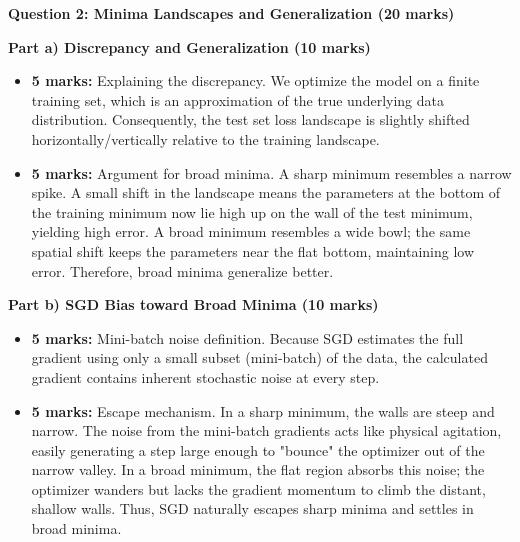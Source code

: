 \documentclass[11pt]{article}
\begin{document}
\textbf{Question 2: Minima Landscapes and Generalization (20 marks)}

\textbf{Part a) Discrepancy and Generalization (10 marks)}
\begin{itemize}
    \item \textbf{5 marks:} Explaining the discrepancy. We optimize the model on a finite training set, which is an approximation of the true underlying data distribution. Consequently, the test set loss landscape is slightly shifted horizontally/vertically relative to the training landscape.
    \item \textbf{5 marks:} Argument for broad minima. A sharp minimum resembles a narrow spike. A small shift in the landscape means the parameters at the bottom of the training minimum now lie high up on the wall of the test minimum, yielding high error. A broad minimum resembles a wide bowl; the same spatial shift keeps the parameters near the flat bottom, maintaining low error. Therefore, broad minima generalize better.
\end{itemize}

\textbf{Part b) SGD Bias toward Broad Minima (10 marks)}
\begin{itemize}
    \item \textbf{5 marks:} Mini-batch noise definition. Because SGD estimates the full gradient using only a small subset (mini-batch) of the data, the calculated gradient contains inherent stochastic noise at every step.
    \item \textbf{5 marks:} Escape mechanism. In a sharp minimum, the walls are steep and narrow. The noise from the mini-batch gradients acts like physical agitation, easily generating a step large enough to "bounce" the optimizer out of the narrow valley. In a broad minimum, the flat region absorbs this noise; the optimizer wanders but lacks the gradient momentum to climb the distant, shallow walls. Thus, SGD naturally escapes sharp minima and settles in broad minima.
\end{itemize}
\end{document}
